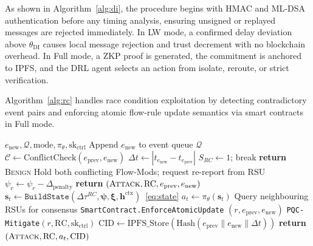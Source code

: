 As shown in Algorithm~\ref{alg:di}, the procedure begins
with HMAC and ML-DSA authentication before any timing
analysis, ensuring unsigned or replayed messages are
rejected immediately. In LW mode, a confirmed delay
deviation above $\theta_{\mathrm{DI}}$ causes local
message rejection and trust decrement with no blockchain
overhead. In Full mode, a ZKP proof is generated, the
commitment is anchored to IPFS, and the DRL agent selects
an action from isolate, reroute, or strict verification.

Algorithm~\ref{alg:rc} handles race condition exploitation
by detecting contradictory event pairs and enforcing atomic
flow-rule update semantics via smart contracts in Full mode.

\begin{algorithm}[H]
\caption{Race Condition Detection and Mitigation
(\texttt{RC-Defend})}
\label{alg:rc}
\begin{algorithmic}[1]
\small
{}
  {$e_{\mathrm{new}},\mathcal{Q},\mathrm{mode},
  \pi_\theta,\mathrm{sk}_{\mathrm{ctrl}}$}
  \State Append $e_{\mathrm{new}}$ to event queue $\mathcal{Q}$
    \State $\mathcal{C} \gets
      \mathrm{ConflictCheck}(e_{\mathrm{prev}},e_{\mathrm{new}})$
    \State $\Delta t \gets |t_{e_{\mathrm{new}}}
      - t_{e_{\mathrm{prev}}}|$
      \State $S_{RC} \gets 1$; break
    \EndIf
  \EndFor
    \State \textbf{return} \textsc{Benign}
  \EndIf
    \State Hold both conflicting Flow-Mods;
      request re-report from RSU
    \State $\psi_r \gets \psi_r - \Delta_{\mathrm{penalty}}$
    \State \textbf{return}
      $(\textsc{Attack},\mathrm{RC},e_{\mathrm{prev}},
      e_{\mathrm{new}})$
  \EndIf
  \State $\mathbf{s}_t \gets \texttt{BuildState}
    (\Delta\tau^{RC},\boldsymbol{\psi},\boldsymbol{\xi},
    \mathbf{h}^{\mathrm{ctx}})$~\eqref{eq:state}
  \State $a_t \gets \pi_\theta(\mathbf{s}_t)$
    \State Query neighbouring RSUs for consensus
    \State \texttt{SmartContract.EnforceAtomicUpdate}
      $(r,e_{\mathrm{prev}},e_{\mathrm{new}})$
    \State \texttt{PQC-Mitigate}$(r,\mathrm{RC},
      \mathrm{sk}_{\mathrm{ctrl}})$
  \EndIf
  \State $\mathrm{CID} \gets \mathrm{IPFS\_Store}
    (\mathrm{Hash}(e_{\mathrm{prev}}\|e_{\mathrm{new}}\|\Delta t))$
  \State \textbf{return}
    $(\textsc{Attack},\mathrm{RC},a_t,\mathrm{CID})$
\EndProcedure
\end{algorithmic}
\end{algorithm}

